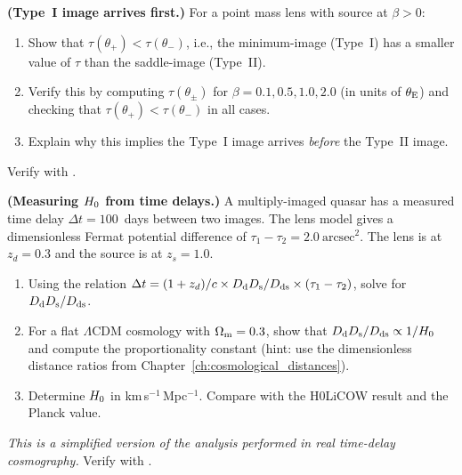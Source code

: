 \begin{exercise}
\label{ex:typeI_first}
\textbf{(Type~I image arrives first.)}
For a point mass lens with source at $\beta > 0$:
\begin{enumerate}[label=(\alph*)]
    \item Show that $\tau(\theta_+) < \tau(\theta_-)$, i.e., the
          minimum-image (Type~I) has a smaller value of $\tau$ than the
          saddle-image (Type~II).
    \item Verify this by computing $\tau(\theta_\pm)$ for
          $\beta = 0.1, 0.5, 1.0, 2.0$ (in units of $\theta_{\mathrm{E}}$) and
          checking that $\tau(\theta_+) < \tau(\theta_-)$ in all cases.
    \item Explain why this implies the Type~I image arrives
          \textit{before} the Type~II image.
\end{enumerate}
Verify with
.
\end{exercise}

\begin{exercise}
\label{ex:H0_from_time_delay}
\textbf{(Measuring $H_0$ from time delays.)}
A multiply-imaged quasar has a measured time delay $\Delta t = 100$~days
between two images.  The lens model gives a dimensionless Fermat
potential difference of $\tau_1 - \tau_2 = 2.0~\text{arcsec}^2$.  The
lens is at $z_d = 0.3$ and the source is at $z_s = 1.0$.
\begin{enumerate}[label=(\alph*)]
    \item Using the relation
          $\Delta t = (1+z_d)/c \times D_{\mathrm{d}}D_{\mathrm{s}}/D_{\mathrm{ds}}
          \times (\tau_1 - \tau_2)$,
          solve for $D_{\mathrm{d}}D_{\mathrm{s}}/D_{\mathrm{ds}}$.
    \item For a flat $\Lambda$CDM cosmology with $\Omega_{\mathrm{m}} = 0.3$,
          show that $D_{\mathrm{d}}D_{\mathrm{s}}/D_{\mathrm{ds}} \propto 1/H_0$ and compute the
          proportionality constant (hint: use the dimensionless distance
          ratios from Chapter~\ref{ch:cosmological_distances}).
    \item Determine $H_0$ in km\,s$^{-1}$\,Mpc$^{-1}$.  Compare
          with the H0LiCOW result and the Planck value.
\end{enumerate}
\textit{This is a simplified version of the analysis performed in real
time-delay cosmography.}
Verify with
.
\end{exercise}

